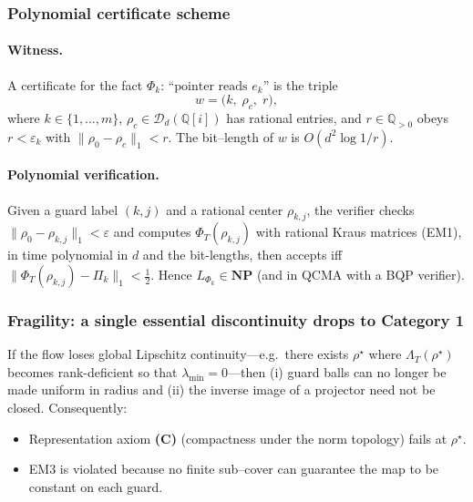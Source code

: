 \documentclass[12pt]{article}
\theoremstyle{definition}
\theoremstyle{plain}
\begin{document}
\subsubsection{Polynomial certificate scheme}

\paragraph{Witness.}
A certificate for the fact
\(\Phi_k:\,“\text{pointer reads }e_k”\) is the triple
\[
  w = \bigl(k,\; \rho_c,\; r\bigr),
\]
where \(k\in\{1,\dots,m\}\), \(\rho_c\in\mathcal{D}_d(\mathbb{Q}[i])\)
has rational entries, and \(r\in\mathbb{Q}_{>0}\) obeys
\(r<\varepsilon_k\) with
\(\|\rho_0-\rho_c\|_1<r\).  The bit–length of \(w\) is
\(O(d^2\log 1/r)\).

\paragraph{Polynomial verification.}
Given a guard label $(k,j)$ and a rational center $\rho_{k,j}$, the verifier checks $\|\rho_0-\rho_{k,j}\|_1<\varepsilon$ and computes $\Phi_T(\rho_{k,j})$ with rational Kraus matrices (EM1), in time polynomial in $d$ and the bit-lengths, then accepts iff $\|\Phi_T(\rho_{k,j})-\Pi_k\|_1<\tfrac{1}{2}$. Hence $L_{\Phi_k}\in\mathbf{NP}$ (and in QCMA with a BQP verifier).

\subsubsection{Fragility: a single essential discontinuity drops to
            Category 1}

If the flow loses global Lipschitz continuity—e.g.\ there exists
\(\rho^\star\) where \(\Lambda_T(\rho^\star)\) becomes rank-deficient
so that \(\lambda_{\min}=0\)—then (i) guard balls can no longer be made
uniform in radius and (ii) the inverse image of a projector need not be
closed.  Consequently:

\begin{itemize}[leftmargin=12pt,itemsep=1pt]
  \item Representation axiom \textbf{(C)} (compactness under the norm
        topology) fails at \(\rho^\star\).
  \item EM3 is violated because no finite sub–cover can guarantee the
        map to be constant on each guard.
\end{itemize}
\end{document}
